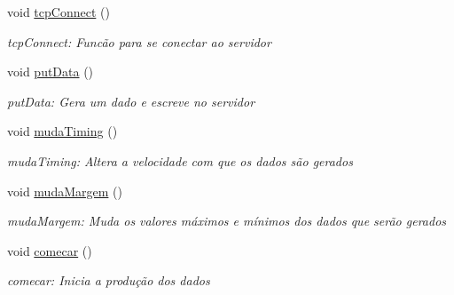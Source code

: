 \begin{DoxyCompactItemize}
\item 
\mbox{\label{class_main_window_ac5b669957c442b6eb68573dacfce33e1}} 
void \hyperlink{class_main_window_ac5b669957c442b6eb68573dacfce33e1}{tcp\+Connect} ()
\begin{DoxyCompactList}\small\item\em tcp\+Connect\+: Funcão para se conectar ao servidor \end{DoxyCompactList}\item 
\mbox{\label{class_main_window_afdfeb13ec363b0eb8ecacaf0aa13b605}} 
void \hyperlink{class_main_window_afdfeb13ec363b0eb8ecacaf0aa13b605}{put\+Data} ()
\begin{DoxyCompactList}\small\item\em put\+Data\+: Gera um dado e escreve no servidor \end{DoxyCompactList}\item 
\mbox{\label{class_main_window_a2f369d2295ca98bfe9d143ba95544fbf}} 
void \hyperlink{class_main_window_a2f369d2295ca98bfe9d143ba95544fbf}{muda\+Timing} ()
\begin{DoxyCompactList}\small\item\em muda\+Timing\+: Altera a velocidade com que os dados são gerados \end{DoxyCompactList}\item 
\mbox{\label{class_main_window_abe9b2eab84aab26136fdb7ee40fe5c6b}} 
void \hyperlink{class_main_window_abe9b2eab84aab26136fdb7ee40fe5c6b}{muda\+Margem} ()
\begin{DoxyCompactList}\small\item\em muda\+Margem\+: Muda os valores máximos e mínimos dos dados que serão gerados \end{DoxyCompactList}\item 
\mbox{\label{class_main_window_a37c87f8835aaa425ea575921a3cd15ac}} 
void \hyperlink{class_main_window_a37c87f8835aaa425ea575921a3cd15ac}{comecar} ()
\begin{DoxyCompactList}\small\item\em comecar\+: Inicia a produção dos dados \end{DoxyCompactList}\item 

\end{DoxyCompactItemize}
